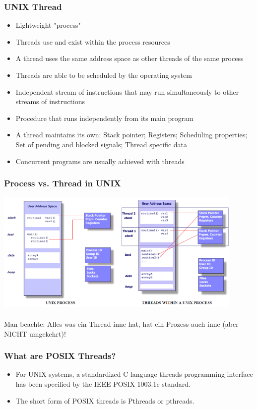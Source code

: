 \subsubsection{UNIX Thread}
\begin{itemize}
\item Lightweight "process"
\item Threads use and exist within the process resources
\item A thread uses the same address space as other threads of the same process
\item Threads are able to be scheduled by the operating system
\item Independent stream of instructions that may run simultaneously to other streams of instructions
\item Procedure that runs independently from its main program
\item A thread maintains its own: Stack pointer; Registers; Scheduling properties; Set of pending and blocked signals; Thread specific data
\item Concurrent programs are usually achieved with threads
\end{itemize}
\subsubsection{Process vs. Thread in UNIX}
\includegraphics[width=12cm]{images/Concurrency/ProcessVsThread.png}\\\\
Man beachte: Alles was ein Thread inne hat, hat ein Prozess auch inne (aber NICHT umgekehrt)!
\subsubsection{What are POSIX Threads?}
\begin{itemize}
\item For UNIX systems, a standardized C language threads programming interface has been specified by the IEEE POSIX 1003.1c standard.
\item The short form of POSIX threads is Pthreads or pthreads.
\end{itemize}

